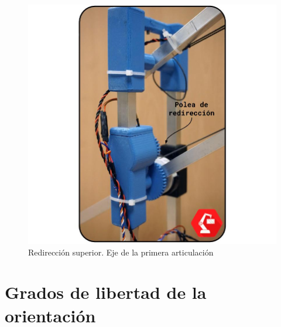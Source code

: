     \begin{minipage}{0.47\textwidth}\raggedright
        \begin{figure}[H]
            \centering
            \includegraphics[width=1.15\textwidth]{figuras/Imagenes_Mecanica/foto_brazo_8.jpg}
            \caption{Redirección superior. Eje de la primera articulación}
            \label{fig:Mecanica:redireccion_2}
        \end{figure}
    \end{minipage}

\section{Grados de libertad de la orientación}
